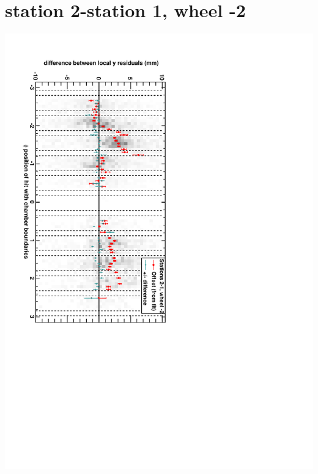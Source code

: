 \documentclass[compress]{beamer}
\begin{document}
\section*{station 2-station 1, wheel -2}
\begin{frame} \vfill \mbox{\hspace{-1 cm}\includegraphics[height=1.2\linewidth, angle=90]{DTzdiff12VsPhi_whA_slope.pdf}} \end{frame}
\end{document}
